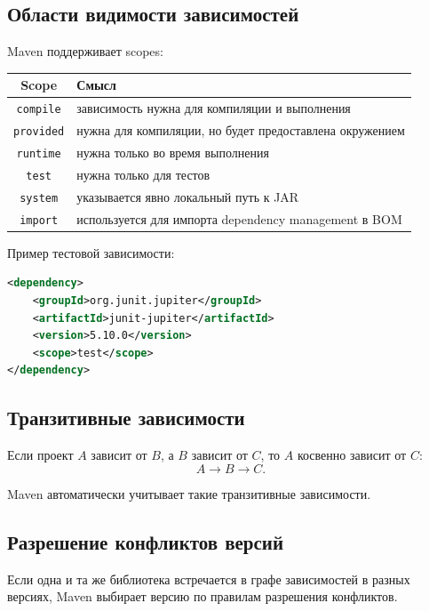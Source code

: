 \documentclass[12pt,a4paper]{article}
\begin{document}
\subsection{Области видимости зависимостей}

Maven поддерживает scopes:

\begin{center}
\begin{tabular}{|c|p{9cm}|}
\hline
Scope & Смысл \\
\hline
\texttt{compile} & зависимость нужна для компиляции и выполнения \\
\hline
\texttt{provided} & нужна для компиляции, но будет предоставлена окружением \\
\hline
\texttt{runtime} & нужна только во время выполнения \\
\hline
\texttt{test} & нужна только для тестов \\
\hline
\texttt{system} & указывается явно локальный путь к JAR \\
\hline
\texttt{import} & используется для импорта dependency management в BOM \\
\hline
\end{tabular}
\end{center}

Пример тестовой зависимости:

\begin{lstlisting}[language=XML]
<dependency>
    <groupId>org.junit.jupiter</groupId>
    <artifactId>junit-jupiter</artifactId>
    <version>5.10.0</version>
    <scope>test</scope>
</dependency>
\end{lstlisting}

\subsection{Транзитивные зависимости}

Если проект $A$ зависит от $B$, а $B$ зависит от $C$, то $A$ косвенно зависит от $C$:
\[
A \rightarrow B \rightarrow C.
\]

Maven автоматически учитывает такие транзитивные зависимости.

\subsection{Разрешение конфликтов версий}

Если одна и та же библиотека встречается в графе зависимостей в разных версиях, Maven выбирает версию по правилам разрешения конфликтов.
\end{document}
